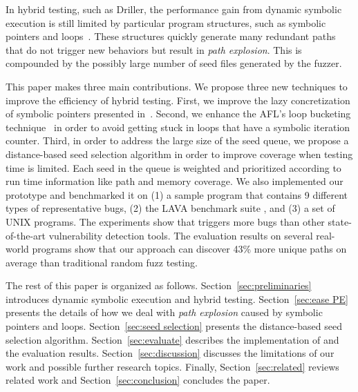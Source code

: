 In hybrid testing, such as Driller, the performance gain from dynamic
symbolic execution is still limited by particular program
structures, such as symbolic pointers and loops~\cite{schwartz2010all,
Boonstoppel:RAP, cadar2011symbolic, baldoni2016survey}. These structures
quickly generate many redundant paths that do not trigger new behaviors
but result in \textit{path explosion}. This is compounded by the possibly
large number of seed files generated by the fuzzer.

This paper makes three main contributions. We propose three new
techniques to improve the efficiency of hybrid testing. First, we
improve the lazy concretization of symbolic pointers presented
in~\cite{chipounov2011s2e}. Second, we enhance the AFL's loop bucketing
technique~\cite{online:afl} in order to avoid getting stuck in loops
that have a symbolic iteration counter. Third, in order to address the
large size of the seed queue, we propose a distance-based seed
selection algorithm in order to improve coverage when testing time is
limited. Each seed in the queue is weighted and prioritized according
to run time information like path and memory coverage. We also 
implemented our prototype \prototype and benchmarked it on 
(1) a sample program that contains 9
different types of representative bugs, (2) the LAVA benchmark suite
\cite{dolan2016lava}, and (3) a set of UNIX programs. 
The experiments show that \prototype triggers more bugs
than other state-of-the-art vulnerability detection tools. 
The evaluation results on several real-world programs show that our approach can
discover 43\% more unique paths on average than traditional random fuzz
testing.

The rest of this paper is organized as follows.
Section~\ref{sec:preliminaries} introduces dynamic symbolic execution
and hybrid testing. Section~\ref{sec:ease PE} presents the details of
how we deal with \textit{path explosion} caused by symbolic pointers
and loops. Section~\ref{sec:seed selection} presents the distance-based
seed selection algorithm. Section~\ref{sec:evaluate} describes the
implementation of \prototype and the evaluation results.
Section~\ref{sec:discussion} discusses the limitations of our work and
possible further research topics. Finally, Section~\ref{sec:related} reviews
related work and Section~\ref{sec:conclusion} concludes the paper.
